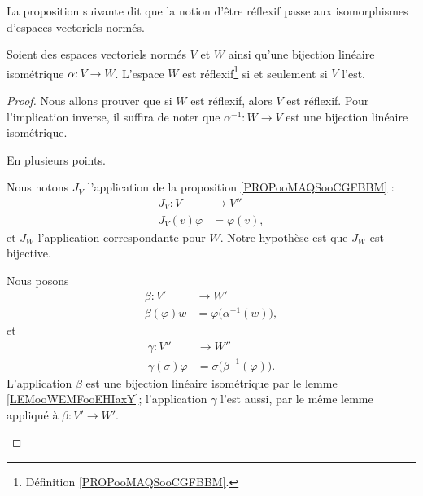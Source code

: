 La proposition suivante dit que la notion d'être réflexif passe aux isomorphismes d'espaces vectoriels normés.
\begin{proposition}      \label{PROPooVRQKooLdmajh}
	Soient des espaces vectoriels normés \( V\) et \( W\) ainsi qu'une bijection linéaire isométrique \( \alpha\colon V\to W\). L'espace \( W\) est réflexif\footnote{Définition \ref{PROPooMAQSooCGFBBM}.} si et seulement si \( V\) l'est.
\end{proposition}

\begin{proof}
	Nous allons prouver que si \( W\) est réflexif, alors \( V\) est réflexif. Pour l'implication inverse, il suffira de noter que \( \alpha^{-1}\colon W\to V\) est une bijection linéaire isométrique.

	En plusieurs points.
	\begin{subproof}
		Nous notons \( J_V\) l'application de la proposition \ref{PROPooMAQSooCGFBBM} :
		\begin{equation}
			\begin{aligned}
				J_V\colon V   & \to V''       \\
				J_V(v)\varphi & = \varphi(v),
			\end{aligned}
		\end{equation}
		et \( J_W\) l'application correspondante pour \( W\). Notre hypothèse est que \( J_W\) est bijective.

		Nous posons
		\begin{equation}
			\begin{aligned}
				\beta\colon V'  & \to W'                              \\
				\beta(\varphi)w & =\varphi\big( \alpha^{-1}(w) \big),
			\end{aligned}
		\end{equation}
		et
		\begin{equation}
			\begin{aligned}
				\gamma\colon V''      & \to W''                                 \\
				\gamma(\sigma)\varphi & =\sigma\big( \beta^{-1}(\varphi) \big).
			\end{aligned}
		\end{equation}
		L'application \( \beta\) est une bijection linéaire isométrique par le lemme \ref{LEMooWEMFooEHIaxY}; l'application \( \gamma\) l'est aussi, par le même lemme appliqué à \( \beta\colon V'\to W'\).


\end{subproof}
\end{proof}
